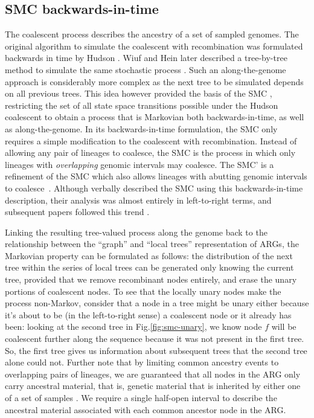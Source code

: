 \documentclass{article}
\begin{document}
\subsection{SMC backwards-in-time}\label{par:description}

% 
The coalescent process describes the ancestry of a set of sampled genomes.
The original algorithm 
to simulate the coalescent with
recombination was formulated backwards in time
by Hudson \citeyearpar{hudson_properties_1983}. 
Wiuf and Hein later described
a tree-by-tree method to simulate the same stochastic process 
\citep{wiuf_recombination_1999}.
Such an along-the-genome approach is considerably more complex as the next 
tree to be simulated depends on all previous trees.
This idea however provided the basis of the 
SMC \citep{mcvean_approximating_2005}, restricting the set of all state
space transitions possible under the Hudson coalescent to
obtain a process that is Markovian both backwards-in-time, 
as well as along-the-genome.
In its backwards-in-time formulation, the SMC only requires a
simple modification to the coalescent with recombination.
Instead of allowing any pair of lineages to coalesce,
the SMC is the process in which only lineages with \emph{overlapping} 
genomic intervals may coalesce. The SMC' is a refinement 
of the SMC which also allows lineages with abutting genomic intervals to 
coalesce~\citep{marjoram_fast_2006}.
Although \citet{mcvean_approximating_2005} verbally described the SMC
using this backwards-in-time description, their analysis
was almost entirely in left-to-right terms,
and subsequent papers followed this trend
\citep{li_inference_2011,paul_accurate_2011,schiffels_inferring_2014,
rasmussen_genome-wide_2014}.

Linking the resulting tree-valued process along the genome back to
the relationship between the ``graph'' and
``local trees'' representation of ARGs, 
the Markovian property can be formulated as follows: 
the distribution of the next tree within the series
of local trees can be generated only knowing the current tree,
provided that we remove recombinant nodes entirely,
and erase the unary portions of coalescent nodes.
To see that the locally unary nodes make the process non-Markov,
consider that a node in a tree might be unary either because
it's about to be (in the left-to-right sense) a coalescent node 
or it already has been:
looking at the second tree in Fig.\ref{fig:smc-unary},
we know node $f$ will be coalescent further along the sequence
because it was not present in the first tree.
So, the first tree gives us information about subsequent trees
that the second tree alone could not.
Further note that by limiting common ancestry events to overlapping 
pairs of lineages, we are guaranteed that all nodes in the ARG 
only carry ancestral material, that is,
genetic material that is inherited by either one of a set of samples
\citep{wiuf_ancestry_1999}.
We require a single half-open interval to describe
the ancestral
material associated with each common ancestor node in the ARG.
\end{document}
